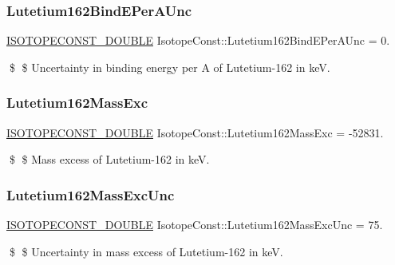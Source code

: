 \subsubsection{\texorpdfstring{Lutetium162\+Bind\+E\+Per\+A\+Unc}{Lutetium162BindEPerAUnc}}
{\footnotesize\ttfamily \mbox{\hyperlink{group___isotope_const-_macros_ga8f45a7272ce02c0b4c65c44636ed719a}{I\+S\+O\+T\+O\+P\+E\+C\+O\+N\+S\+T\+\_\+\+D\+O\+U\+B\+LE}} Isotope\+Const\+::\+Lutetium162\+Bind\+E\+Per\+A\+Unc = 0.}

\$ \$ Uncertainty in binding energy per A of Lutetium-\/162 in keV. \mbox{\label{group___isotope_const-_lutetium-_lu162_ga3ec3d656fc612efd23ac1be3e1b9cf00}} 
\subsubsection{\texorpdfstring{Lutetium162\+Mass\+Exc}{Lutetium162MassExc}}
{\footnotesize\ttfamily \mbox{\hyperlink{group___isotope_const-_macros_ga8f45a7272ce02c0b4c65c44636ed719a}{I\+S\+O\+T\+O\+P\+E\+C\+O\+N\+S\+T\+\_\+\+D\+O\+U\+B\+LE}} Isotope\+Const\+::\+Lutetium162\+Mass\+Exc = -\/52831.}

\$ \$ Mass excess of Lutetium-\/162 in keV. \mbox{\label{group___isotope_const-_lutetium-_lu162_ga8a43bdda0c998ef868426dd73a7fb546}} 
\subsubsection{\texorpdfstring{Lutetium162\+Mass\+Exc\+Unc}{Lutetium162MassExcUnc}}
{\footnotesize\ttfamily \mbox{\hyperlink{group___isotope_const-_macros_ga8f45a7272ce02c0b4c65c44636ed719a}{I\+S\+O\+T\+O\+P\+E\+C\+O\+N\+S\+T\+\_\+\+D\+O\+U\+B\+LE}} Isotope\+Const\+::\+Lutetium162\+Mass\+Exc\+Unc = 75.}

\$ \$ Uncertainty in mass excess of Lutetium-\/162 in keV. \mbox{\label{group___isotope_const-_lutetium-_lu162_ga103b0651ac7ac22e0b83faf590196209}} 
